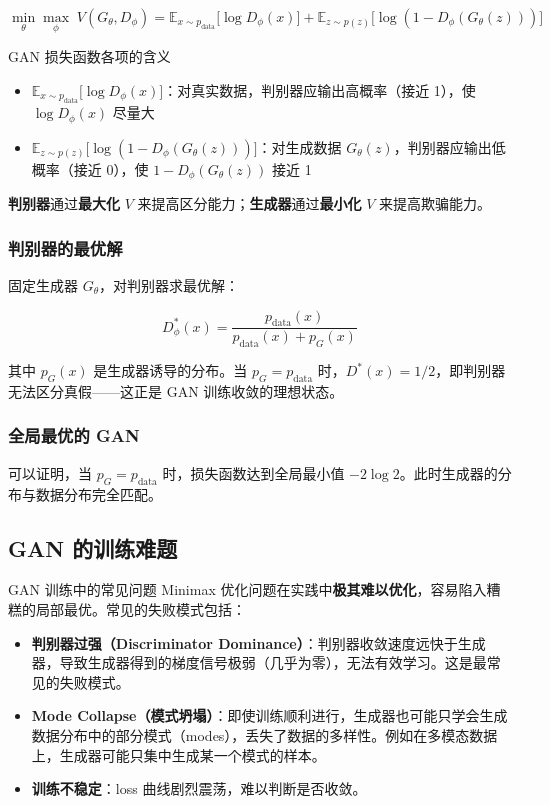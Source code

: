 $$\min_\theta \max_\phi \; V(G_\theta, D_\phi) = \mathbb{E}_{x \sim p_{\text{data}}} {[}\log D_\phi(x){]} + \mathbb{E}_{z \sim p(z)} {[}\log(1 - D_\phi(G_\theta(z))){]}$$

\begin{importantbox}{GAN 损失函数各项的含义}
\begin{itemize}
    \item $\mathbb{E}_{x \sim p_{\text{data}}} {[}\log D_\phi(x){]}$：对真实数据，判别器应输出高概率（接近 1），使 $\log D_\phi(x)$ 尽量大
    \item $\mathbb{E}_{z \sim p(z)} {[}\log(1 - D_\phi(G_\theta(z))){]}$：对生成数据 $G_\theta(z)$，判别器应输出低概率（接近 0），使 $1 - D_\phi(G_\theta(z))$ 接近 1
\end{itemize}
\textbf{判别器}通过\textbf{最大化} $V$ 来提高区分能力；\textbf{生成器}通过\textbf{最小化} $V$ 来提高欺骗能力。
\end{importantbox}

\subsubsection{判别器的最优解}

固定生成器 $G_\theta$，对判别器求最优解：

$$D^*_\phi(x) = \frac{p_{\text{data}}(x)}{p_{\text{data}}(x) + p_G(x)}$$

其中 $p_G(x)$ 是生成器诱导的分布。当 $p_G = p_{\text{data}}$ 时，$D^*(x) = 1/2$，即判别器无法区分真假——这正是 GAN 训练收敛的理想状态。

\subsubsection{全局最优的 GAN}

可以证明，当 $p_G = p_{\text{data}}$ 时，损失函数达到全局最小值 $-2\log 2$。此时生成器的分布与数据分布完全匹配。

\subsection{GAN 的训练难题}

\begin{warningbox}{GAN 训练中的常见问题}
Minimax 优化问题在实践中\textbf{极其难以优化}，容易陷入糟糕的局部最优。常见的失败模式包括：
\begin{itemize}
    \item \textbf{判别器过强（Discriminator Dominance）}：判别器收敛速度远快于生成器，导致生成器得到的梯度信号极弱（几乎为零），无法有效学习。这是最常见的失败模式。
    \item \textbf{Mode Collapse（模式坍塌）}：即使训练顺利进行，生成器也可能只学会生成数据分布中的部分模式（modes），丢失了数据的多样性。例如在多模态数据上，生成器可能只集中生成某一个模式的样本。
    \item \textbf{训练不稳定}：loss 曲线剧烈震荡，难以判断是否收敛。
\end{itemize}
\end{warningbox}

